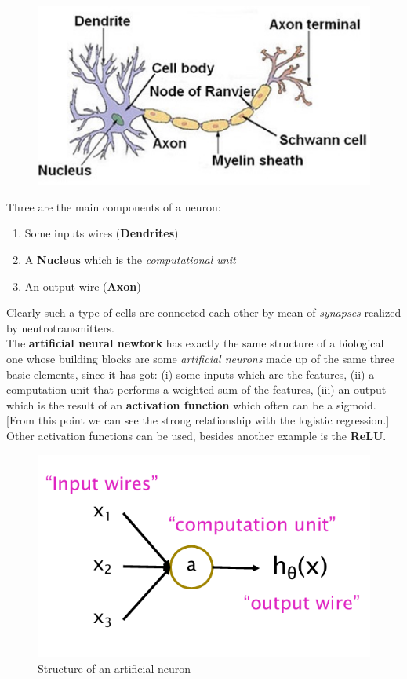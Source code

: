 \begin{figure}[h]
    \centering
    \includegraphics[scale=0.5]{img/bio_neuron.png}
\end{figure}
\noindent
Three are the main components of a neuron:
\begin{enumerate}
    \itemsep-0.2em
    \item Some inputs wires (\textbf{Dendrites})
    \item A \textbf{Nucleus} which is the \textit{computational unit}
    \item An output wire (\textbf{Axon})
\end{enumerate}
Clearly such a type of cells are connected each other by mean of \textit{synapses} realized by neutrotransmitters. \\
The \textbf{artificial neural newtork} has exactly the same structure of a biological one whose building blocks are some \textit{artificial neurons} made up of the same three basic elements, since it has got: (i) some inputs which are the features, (ii) a computation unit that performs a weighted sum of the features, (iii) an output which is the result of an \textbf{activation function} which often can be a sigmoid. [From this point we can see the strong relationship with the logistic regression.] Other activation functions can be used, besides another example is the \textbf{ReLU}.

\begin{figure}[h]
    \centering
    \includegraphics[scale=0.7]{img/artificialneuron.png}
    \caption{Structure of an artificial neuron}
\end{figure}

